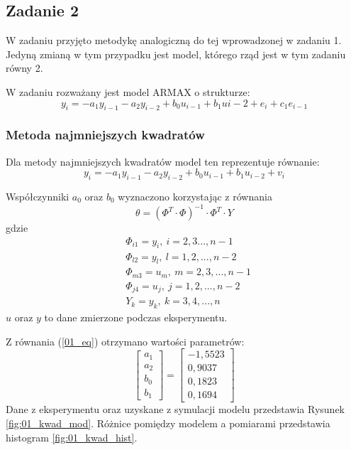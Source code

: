 \documentclass[a4paper,15pt]{article}
\begin{document}
\subsection{Zadanie 2 }
W zadaniu przyjęto metodykę analogiczną do tej wprowadzonej w zadaniu 1. Jedyną zmianą w tym przypadku jest model, którego rząd jest w tym zadaniu równy 2.

W zadaniu rozważany jest model ARMAX o strukturze:
\begin{equation*}
y_i = -a_1y_{i-1}-a_2y_{i-2}+b_0u_{i-1}+b_1u{i-2}+e_i+c_1e_{i-1}
\end{equation*}

\subsubsection{Metoda najmniejszych kwadratów}
Dla metody najmniejszych kwadratów model ten reprezentuje równanie:
\begin{equation*}
y_i = -a_1y_{i-1}-a_2y_{i-2}+b_0u_{i-1}+b_1u_{i-2}+v_i
\end{equation*}

Współczynniki \( a_0 \) oraz \( b_0 \) wyznaczono korzystając z równania
\begin{equation}\label{01_eq}
\theta =  ( \Phi ^T \cdot \Phi )^{-1} \cdot \Phi ^T \cdot Y 
\end{equation}
gdzie
\begin{align*}
& \Phi _{i1} = y_i, \ i=2,3...,n-1 \\
& \Phi _{l2} = y_l, \ l=1,2,...,n-2 \\
& \Phi _{m3} = u_m, \ m=2,3,...,n-1 \\
& \Phi _{j4} = u_j, \ j=1,2,...,n-2 \\
& Y _k = y_k, \ k=3,4,...,n
\end{align*}
\( u \) oraz \( y \) to dane zmierzone podczas eksperymentu. 

Z równania (\ref{01_eq}) otrzymano wartości parametrów:
\begin{equation}
\begin{bmatrix}
a_1 \\
a_2 \\
b_0 \\
b_1
\end{bmatrix}
=
\begin{bmatrix}
-1,5523 \\
0,9037 \\
0,1823 \\
0,1694   
\end{bmatrix}
\end{equation}
Dane z eksperymentu oraz uzyskane z symulacji modelu przedstawia Rysunek \ref{fig:01_kwad_mod}. Różnice pomiędzy modelem a pomiarami przedstawia histogram \ref{fig:01_kwad_hist}. 
\end{document}
